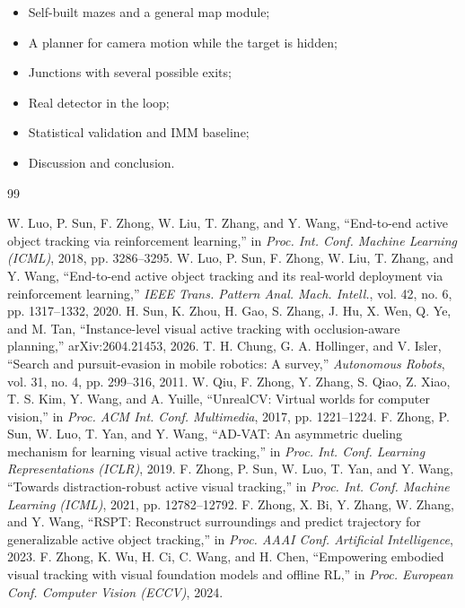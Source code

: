 \documentclass[12pt,a4paper]{article}
\begin{document}
\begin{itemize}
  \item Self-built mazes and a general map module;
  \item A planner for camera motion while the target is hidden;
  \item Junctions with several possible exits;
  \item Real detector in the loop;
  \item Statistical validation and IMM baseline;
  \item Discussion and conclusion.
\end{itemize}
\clearpage
\begin{thebibliography}{99}
 W. Luo, P. Sun, F. Zhong, W. Liu, T. Zhang, and Y. Wang, ``End-to-end active object tracking via reinforcement learning,'' in \emph{Proc. Int. Conf. Machine Learning (ICML)}, 2018, pp. 3286–3295.
 W. Luo, P. Sun, F. Zhong, W. Liu, T. Zhang, and Y. Wang, ``End-to-end active object tracking and its real-world deployment via reinforcement learning,'' \emph{IEEE Trans. Pattern Anal. Mach. Intell.}, vol. 42, no. 6, pp. 1317–1332, 2020.
 H. Sun, K. Zhou, H. Gao, S. Zhang, J. Hu, X. Wen, Q. Ye, and M. Tan, ``Instance-level visual active tracking with occlusion-aware planning,'' arXiv:2604.21453, 2026.
 T. H. Chung, G. A. Hollinger, and V. Isler, ``Search and pursuit-evasion in mobile robotics: A survey,'' \emph{Autonomous Robots}, vol. 31, no. 4, pp. 299–316, 2011.
 W. Qiu, F. Zhong, Y. Zhang, S. Qiao, Z. Xiao, T. S. Kim, Y. Wang, and A. Yuille, ``UnrealCV: Virtual worlds for computer vision,'' in \emph{Proc. ACM Int. Conf. Multimedia}, 2017, pp. 1221–1224.
 F. Zhong, P. Sun, W. Luo, T. Yan, and Y. Wang, ``AD-VAT: An asymmetric dueling mechanism for learning visual active tracking,'' in \emph{Proc. Int. Conf. Learning Representations (ICLR)}, 2019.
 F. Zhong, P. Sun, W. Luo, T. Yan, and Y. Wang, ``Towards distraction-robust active visual tracking,'' in \emph{Proc. Int. Conf. Machine Learning (ICML)}, 2021, pp. 12782–12792.
 F. Zhong, X. Bi, Y. Zhang, W. Zhang, and Y. Wang, ``RSPT: Reconstruct surroundings and predict trajectory for generalizable active object tracking,'' in \emph{Proc. AAAI Conf. Artificial Intelligence}, 2023.
 F. Zhong, K. Wu, H. Ci, C. Wang, and H. Chen, ``Empowering embodied visual tracking with visual foundation models and offline RL,'' in \emph{Proc. European Conf. Computer Vision (ECCV)}, 2024.

\end{thebibliography}
\end{document}
